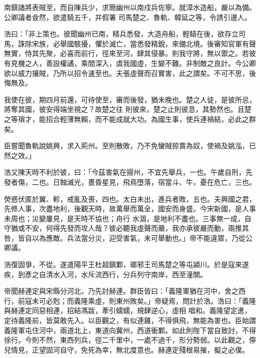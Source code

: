 \begin{pinyinscope}
 南鎮諸將表賊至，而自陳兵少，求簡幽州以南戍兵佐寧。就漳水造船，嚴以為備。公卿議者僉然，欲遣騎五千，并假署
 司馬楚之、魯軌、韓延之等，令誘引邊人。



 浩曰：「非上策也。彼聞幽州已南，精兵悉發，大造舟船，輕騎在後，欲存立司馬，誅除宋族，必舉國駭擾，懼於滅亡，當悉發精銳，來備北境。後審知官軍有聲無實，恃其先聚，必喜而前行，徑來至河，肆其侵暴。則我守將，無以禦之。若彼有見機之人，善設權譎，乘間深入，虞我國虛，生變不難。非制敵之良計。今公卿欲以威力攘賊，乃所以招令速至也。夫張虛聲而召實害，此之謂矣。不可不思，後悔無及。



 我使在彼，期四月前還，可待使至，審而後發，猶未晚也。楚之人徒，是彼所忌，將奪其國，彼安得端坐視之？故楚之往
 則彼來，楚之止則彼息，其勢然也。且楚之等瑣才，能招合輕薄無賴，而不能成就大功。為國生事，使兵連禍結，必此之群矣。



 臣嘗聞魯軌說姚興，求入荊州。至則散敗，乃不免蠻賊掠賣為奴，使禍及姚泓，已然之效。」



 浩又陳天時不利於彼，曰：「今茲害氣在揚州，不宜先舉兵，一也。午歲自刑，先發者傷，二也。日蝕滅光，晝昏星見，飛鳥墮落，宿當斗、牛，憂在危亡，三也。



 熒惑伏匿於翼、軫，戒亂及喪，四也。太白未出，進兵者敗，五也。夫興國之君，先修人事，次盡地利，後觀天時，故萬舉而萬全，國安而身盛。今宋新國，是人事未周也；災變屢見，是天時不協也；舟行
 水涸，是地利不盡也。三事無一成，自守猶或不安，何得先發而攻人哉？彼必聽我虛聲而嚴，我亦承彼嚴而動，兩推其咎，皆自以為應敵。兵法當分災，迎受害氣，未可舉動也。」帝不能違眾，乃從公卿議。



 浩復固爭，不從。遂遣陽平王杜超鎮鄴，瑯邪王司馬楚之等屯潁川。於是寇來遂疾，到彥之自清水入河，水斥流西行，分兵列守南岸，西至潼關。



 帝聞赫連定與宋縣分河北，乃先討赫連。群臣皆曰：「義隆軍猶在河中，舍之西行，前寇未可必剋；而義隆乘虛，則東州敗矣。」帝疑焉，問計於浩。浩曰：「義隆與赫連定同惡相連，招結馮跋，牽引蠕蠕，規肆逆心，虛相
 唱和。義隆望定進，定待義隆前，皆莫敢先入。以臣觀之，有似連雞，不得俱飛，無能為害也。臣始謂義隆軍屯住河中，兩道北上，東道向冀州，西道衝鄴。如此則陛下當自致討，不得徐行。今則不然，東西列兵，徑二千里中，一處不過千，形分勢弱。以此觀之，儜兒情見，正望固河自守，免死為幸，無北度意也。赫連定殘根易摧，擬之必僕。




\end{pinyinscope}
